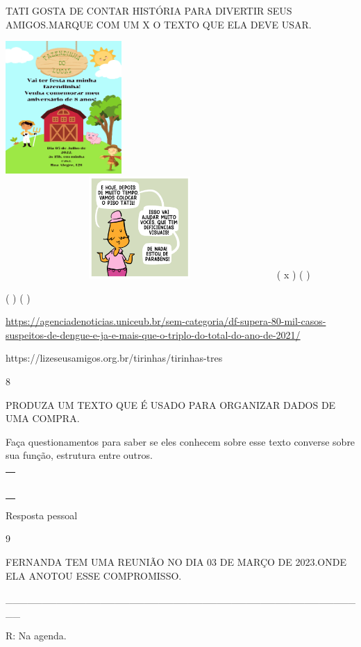 {{{{TATI GOSTA DE CONTAR HISTÓRIA PARA DIVERTIR SEUS AMIGOS.MARQUE COM UM X
O TEXTO QUE ELA DEVE USAR.

\includegraphics[width=1.73819in,height=1.98472in]{media/image109.png}\includegraphics[width=4.02222in,height=1.52917in]{media/image110.png}
( x ) ( )

( ) ( )

\url{https://agenciadenoticias.uniceub.br/sem-categoria/df-supera-80-mil-casos-suspeitos-de-dengue-e-ja-e-mais-que-o-triplo-do-total-do-ano-de-2021/}

https://lizeseusamigos.org.br/tirinhas/tirinhas-tres

\num{8}

PRODUZA UM TEXTO QUE É USADO PARA ORGANIZAR DADOS DE UMA COMPRA.

Faça questionamentos para saber se eles conhecem sobre esse texto
converse sobre sua função, estrutura entre outros.

\begin{longtable}[]{@{}l@{}}
\toprule
\tabularnewline
\tabularnewline
\tabularnewline
\tabularnewline
\tabularnewline
\tabularnewline
\tabularnewline
\bottomrule
\end{longtable}

Resposta pessoal

\num{9}

FERNANDA TEM UMA REUNIÃO NO DIA 03 DE MARÇO DE 2023.ONDE ELA ANOTOU ESSE
COMPROMISSO.

\_\_\_\_\_\_\_\_\_\_\_\_\_\_\_\_\_\_\_\_\_\_\_\_\_\_\_\_\_\_\_\_\_\_\_\_\_\_\_\_\_\_\_\_\_\_\_\_\_\_

R: Na agenda.

}}}}
